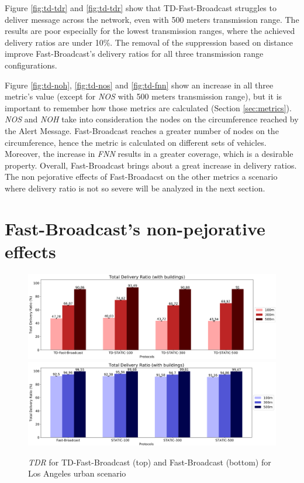 	Figure \ref{fig:td-tdr} and \ref{fig:td-tdr} show that TD-Fast-Broadcast struggles to deliver message across the network, even with 500 meters transmission range. The results are poor especially for the lowest transmission ranges, where the achieved delivery ratios are under 10\%. The removal of the suppression based on distance improve Fast-Broadcast's delivery ratios for all three transmission range configurations. 
	
	
	Figure \ref{fig:td-noh}, \ref{fig:td-nos} and \ref{fig:td-fnn} show an increase in all three metric's value (except for \textit{NOS} with 500 meters transmission range), but it is important to remember how those metrics are calculated (Section \ref{sec:metrics}). \textit{NOS} and \textit{NOH} take into consideration the nodes on the circumference reached by the Alert Message. Fast-Broadcast reaches a greater number of nodes on the circumference, hence the metric is calculated on different sets of vehicles. Moreover, the increase in \textit{FNN} results in a greater coverage, which is a desirable property. Overall, Fast-Broadcast brings about a great increase in delivery ratios. The non pejorative effects of Fast-Broadacst on the other metrics a scenario where delivery ratio is not so severe will be analyzed in the next section.
	
	\section{Fast-Broadcast's non-pejorative effects}
		\begin{figure}[H]
			\centering	
			\includegraphics[width=1.0\textwidth]{immagini/td-fb-la/td-fb/tdr}
			\includegraphics[width=1.0\textwidth]{immagini/td-fb-la/fb/tdr}
			\caption{\textit{TDR} for TD-Fast-Broadcast (top) and Fast-Broadcast (bottom) for Los Angeles urban scenario}
			\label{fig:la-td-tdr}
		\end{figure}
			
